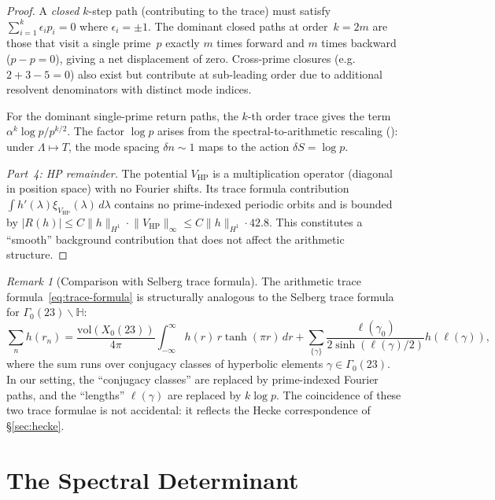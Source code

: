 \documentclass[11pt,a4paper]{article}
\theoremstyle{plain}
\theoremstyle{remark}
\newtheorem{remark}[theorem]{Remark}
\newcommand{\norm}[1]{\lVert #1 \rVert}
\begin{document}
\begin{proof}
A \emph{closed} $k$-step path (contributing to the trace) must satisfy
$\sum_{i=1}^k\epsilon_i p_i=0$ where $\epsilon_i=\pm 1$.  The dominant
closed paths at order~$k=2m$ are those that visit a single prime~$p$ exactly
$m$ times forward and $m$ times backward ($p-p=0$), giving a net displacement
of zero.  Cross-prime closures (e.g.\ $2+3-5=0$) also exist but contribute
at sub-leading order due to additional resolvent denominators with distinct
mode indices.

For the dominant single-prime return paths, the $k$-th order trace gives
the term $\alpha^k\log p/p^{k/2}$.  The factor $\log p$ arises from the
spectral-to-arithmetic rescaling (): under
$\Lambda\mapsto T$, the mode spacing $\delta n\sim 1$ maps to the action
$\delta S=\log p$.

\emph{Part~4: HP remainder.}
The potential $V_{\mathrm{HP}}$ is a multiplication operator (diagonal in
position space) with no Fourier shifts.  Its trace formula contribution
$\int h'(\lambda)\xi_{V_{\mathrm{HP}}}(\lambda)\,d\lambda$ contains no
prime-indexed periodic orbits and is bounded by
$|R(h)|\leq C\norm{h}_{H^1}\cdot\norm{V_{\mathrm{HP}}}_\infty
\leq C\norm{h}_{H^1}\cdot 42.8$.
This constitutes a ``smooth'' background contribution that does not affect
the arithmetic structure.
\end{proof}

\begin{remark}[Comparison with Selberg trace formula]
The arithmetic trace formula~\eqref{eq:trace-formula} is structurally
analogous to the Selberg trace formula for $\Gamma_0(23)\backslash\mathbb{H}$:
\[
  \sum_n h(r_n)=\frac{\mathrm{vol}(X_0(23))}{4\pi}\int_{-\infty}^\infty
  h(r)\,r\tanh(\pi r)\,dr+\sum_{\{\gamma\}}\frac{\ell(\gamma_0)}
  {2\sinh(\ell(\gamma)/2)}\hat{h}(\ell(\gamma)),
\]
where the sum runs over conjugacy classes of hyperbolic elements
$\gamma\in\Gamma_0(23)$.  In our setting, the ``conjugacy classes'' are
replaced by prime-indexed Fourier paths, and the ``lengths'' $\ell(\gamma)$
are replaced by $k\log p$.  The coincidence of these two trace formulae
is not accidental: it reflects the Hecke correspondence of
\S\ref{sec:hecke}.
\end{remark}

\section{The Spectral Determinant}\label{sec:spectral-det}
\end{document}
